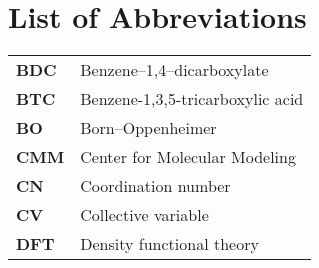 \chapter{List of Abbreviations}

\vspace{-0.5cm}

\begin{longtable}{p{} p{}}
\hline
\textbf{BDC} & Benzene--1,4--dicarboxylate \\
\textbf{BTC} & Benzene-1,3,5-tricarboxylic acid \\
\textbf{BO} & Born--Oppenheimer \\
\textbf{CMM} & Center for Molecular Modeling \\
\textbf{CN} & Coordination number \\
\textbf{CV} & Collective variable \\
\textbf{DFT} & Density functional theory \\

\end{longtable}
